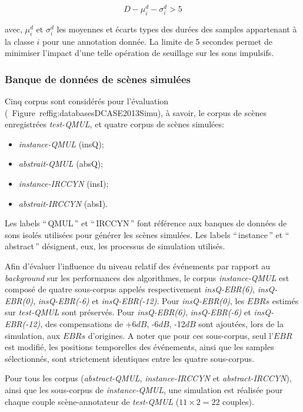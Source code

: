 \begin{equation}
D-\mu_i^d-\sigma_i^d>5
\end{equation}

avec, $\mu_i^d$ et $\sigma_i^d$ les moyennes et écarts types des durées des samples appartenant à la classe $i$ pour une annotation donnée. La limite de 5 secondes permet de minimiser l'impact d'une telle opération de seuillage sur les sons impulsifs.

\subsubsection{Banque de données de scènes simulées}
\label{sec:ch7_datasetEtEbr}

Cinq corpus sont considérés pour l'évaluation (\cf~Figure~ref{fig:databasesDCASE2013Simu}), à savoir, le corpus de scènes enregistrées \emph{test-QMUL}, et quatre corpus de scènes simulées:

\begin{itemize}
\item \emph{instance-QMUL} (insQ);
\item \emph{abstrait-QMUL} (absQ);
\item \emph{instance-IRCCYN} (insI);
\item \emph{abstrait-IRCCYN} (absI).
\end{itemize}

Les labels ``\,QMUL\,'' et ``\,IRCCYN\,'' font référence aux banques de données de sons isolés utilisées pour générer les scènes simulées. Les labels ``\,instance\,'' et ``\,abstract\,'' désignent, eux, les processus de simulation utilisés. 

Afin d'évaluer l'influence du niveau relatif des événements par rapport au \emph{background} sur les performances des algorithmes, le corpus \emph{instance-QMUL} est composé de quatre sous-corpus appelés respectivement \emph{insQ-EBR(6)}, \emph{insQ-EBR(0)}, \emph{insQ-EBR(-6)} et \emph{insQ-EBR(-12)}. Pour \emph{insQ-EBR(0)}, les $EBRs$ estimés sur \emph{test-QMUL} sont préservés.  Pour \emph{insQ-EBR(6)}, \emph{insQ-EBR(-6)} et \emph{insQ-EBR(-12)}, des compensations de +6$dB$, -6$dB$, -12$dB$ sont ajoutées, lors de la simulation, aux $EBRs$ d'origines. A noter que pour ces sous-corpus, seul l'$EBR$ est modifié, les positions temporelles des événements, ainsi que les samples sélectionnés, sont strictement identiques entre les quatre sous-corpus.

Pour tous les corpus (\emph{abstract-QMUL}, \emph{instance-IRCCYN} et \emph{abstract-IRCCYN}), ainsi que les sous-corpus de \emph{instance-QMUL}, une simulation est réalisée pour chaque couple scène-annotateur de \emph{test-QMUL} ($11\times2=22$ couples). 

